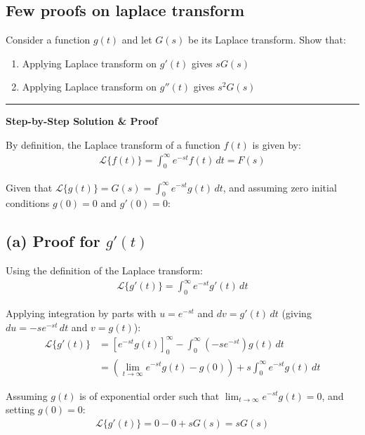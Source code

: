 \documentclass[journal,12pt,onecolumn]{IEEEtran}
\newcommand{\brak}[1]{\left(#1\right)}
\theoremstyle{remark}
\begin{document}
\subsection{Few proofs on laplace transform}
\noindent Consider a function $g\brak{t}$ and let $G\brak{s}$ be its Laplace transform. Show that:
\begin{enumerate}
    \item[(a)] Applying Laplace transform on $g'\brak{t}$ gives $s G\brak{s}$
    \item[(b)] Applying Laplace transform on $g''\brak{t}$ gives $s^2 G\brak{s}$
\end{enumerate}

\vspace{0.3cm}
\hrule
\vspace{0.5cm}

\noindent \textbf{Step-by-Step Solution \& Proof}

\noindent By definition, the Laplace transform of a function $f\brak{t}$ is given by:
\begin{align}
\mathcal{L}\{f\brak{t}\} = \int_{0}^{\infty} e^{-st} f\brak{t} \, dt = F\brak{s}
\end{align}

\noindent Given that $\mathcal{L}\{g\brak{t}\} = G\brak{s} = \int_{0}^{\infty} e^{-st} g\brak{t} \, dt$, and assuming zero initial conditions $g\brak{0} = 0$ and $g'\brak{0} = 0$:

\subsection*{(a) Proof for $g'\brak{t}$}

\noindent Using the definition of the Laplace transform:
\begin{align}
\mathcal{L}\{g'\brak{t}\} = \int_{0}^{\infty} e^{-st} g'\brak{t} \, dt
\end{align}

\noindent Applying integration by parts with $u = e^{-st}$ and $dv = g'\brak{t} \, dt$ (giving $du = -s e^{-st} \, dt$ and $v = g\brak{t}$):
\begin{align}
\mathcal{L}\{g'\brak{t}\} &= \left[ e^{-st} g\brak{t} \right]_{0}^{\infty} - \int_{0}^{\infty} \brak{-s e^{-st}} g\brak{t} \, dt \\[1.5ex]
&= \left( \lim_{t \to \infty} e^{-st} g\brak{t} - g\brak{0} \right) + s \int_{0}^{\infty} e^{-st} g\brak{t} \, dt
\end{align}

\noindent Assuming $g\brak{t}$ is of exponential order such that $\lim_{t \to \infty} e^{-st} g\brak{t} = 0$, and setting $g\brak{0} = 0$:
\begin{align}
\mathcal{L}\{g'\brak{t}\} = 0 - 0 + s G\brak{s} = s G\brak{s}
\end{align}
\end{document}
